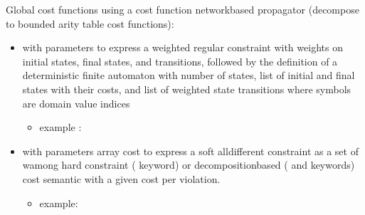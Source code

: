 \documentclass[letterpaper,10pt,openany,oneside,english]{sphinxmanual}
\begin{document}
\sphinxAtStartPar
Global cost functions using a cost function network\sphinxhyphen{}based propagator (decompose to bounded arity table cost functions):
\begin{itemize}
\item {} 
\sphinxAtStartPar
{} with parameters  to express a weighted regular constraint with weights on initial states, final states, and transitions, followed by the definition of a deterministic finite automaton with number of states, list of initial and final states with their costs, and list of weighted state transitions where symbols are domain value indices
\begin{itemize}
\item {} 
\sphinxAtStartPar
example :

\begin{sphinxVerbatim}[commandchars=\\\{\}]
  \PYG{p}{[}   \PYG{p}{]}
         
        
           
            \PYG{p}{[}\PYG{p}{[} \PYG{p}{]}\PYG{p}{[} \PYG{p}{]}\PYG{p}{]}
            \PYG{p}{[}\PYG{p}{[} \PYG{p}{]} \PYG{p}{[} \PYG{p}{]}\PYG{p}{]}
            \PYG{p}{[}\PYG{p}{[}   \PYG{p}{]}\PYG{p}{[}   \PYG{p}{]}
                         \PYG{p}{[}   \PYG{p}{]}\PYG{p}{[}   \PYG{p}{]}\PYG{p}{]}
\end{sphinxVerbatim}

\end{itemize}

\item {} 
\sphinxAtStartPar
{} with parameters array  cost to express a soft alldifferent constraint as a set of wamong hard constraint ( keyword) or decomposition\sphinxhyphen{}based ( and  keywords) cost semantic with a given cost per violation.
\begin{itemize}
\item {} 
\sphinxAtStartPar
example:


\end{itemize}
\end{itemize}
\end{document}
